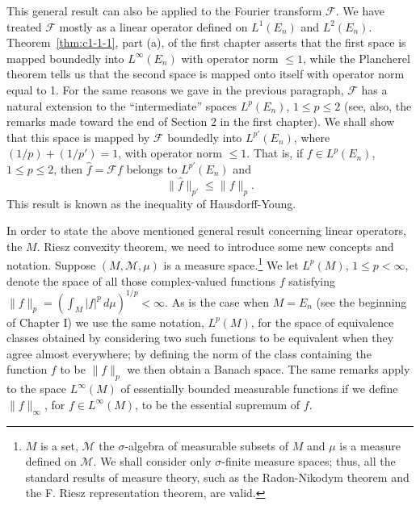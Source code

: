 This general result can also be applied to the Fourier transform
$\mathcal{F}$. We have treated $\mathcal{F}$ mostly as a linear operator
defined on $L^{1}(E_{n})$ and $L^{2}(E_{n})$. Theorem~\ref{thm:c1-1-1}, part
(a), of the first chapter asserts that the first space is mapped boundedly into
$L^{\infty}(E_{n})$ with operator norm $\leq 1$, while the Plancherel theorem
tells us that the second space is mapped onto itself with operator norm equal to
1. For the same reasons we gave in the previous paragraph, $\mathcal{F}$ has a
natural extension to the ``intermediate'' spaces $L^{p}(E_{n})$,
$1 \leq p \leq 2$ (see, also, the remarks made toward the end of Section 2 in
the first chapter). We shall show that this space is mapped by $\mathcal{F}$
boundedly into $L^{p'}(E_{n})$, where $(1/p) + (1/p') = 1$, with operator norm
$\leq 1$. That is, if $f \in L^{p}(E_{n})$, $1 \leq p \leq 2$, then
$\hat{f} = \mathcal{F}f$ belongs to $L^{p'}(E_{n})$ and
\begin{equation}\label{eq:c5-1-2}
\|\hat{f}\|_{p'}\leq\|f\|_{p}.
\end{equation}
This result is known as the inequality of Hausdorff-Young.

In order to state the above mentioned general result concerning linear
operators, the $M$. Riesz convexity theorem, we need to introduce some new
concepts and notation. Suppose $(M, \mathcal{M}, \mu)$ is a measure
space.\footnote{$M$ is a set, $\mathcal{M}$ the $\sigma$-algebra of measurable
subsets of $M$ and $\mu$ is a measure defined on $\mathcal{M}$. We shall
consider only $\sigma$-finite measure spaces; thus, all the standard results of
measure theory, such as the Radon-Nikodym theorem and the F. Riesz
representation theorem, are valid.} We let $L^{p}(M)$, $1 \leq p < \infty$,
denote the space of all those complex-valued functions $f$ satisfying
$\|f\|_{p} = (\int_{M}|f|^{p}\,d\mu)^{1/p} < \infty$. As is the case when
$M = E_{n}$ (see the beginning of Chapter I) we use the same notation,
$L^{p}(M)$, for the space of equivalence classes obtained by considering two
such functions to be equivalent when they agree almost everywhere; by defining
the norm of the class containing the function $f$ to be $\|f\|_{p}$ we then
obtain a Banach space. The same remarks apply to the space $L^{\infty}(M)$ of
essentially bounded measurable functions if we define $\|f\|_{\infty}$, for
$f \in L^{\infty}(M)$, to be the essential supremum of $f$.

